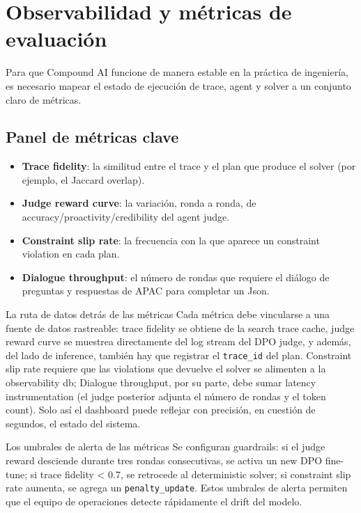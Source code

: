 \section{Observabilidad y métricas de evaluación}

Para que Compound AI funcione de manera estable en la práctica de ingeniería, es necesario mapear el estado de ejecución de trace, agent y solver a un conjunto claro de métricas.

\subsection{Panel de métricas clave}

\begin{itemize}
    \item \textbf{Trace fidelity}: la similitud entre el trace y el plan que produce el solver (por ejemplo, el Jaccard overlap).
    \item \textbf{Judge reward curve}: la variación, ronda a ronda, de accuracy/proactivity/credibility del agent judge.
    \item \textbf{Constraint slip rate}: la frecuencia con la que aparece un constraint violation en cada plan.
    \item \textbf{Dialogue throughput}: el número de rondas que requiere el diálogo de preguntas y respuestas de APAC para completar un Json.
\end{itemize}

\begin{importantbox}{La ruta de datos detrás de las métricas}
Cada métrica debe vincularse a una fuente de datos rastreable: trace fidelity se obtiene de la search trace cache, judge reward curve se muestrea directamente del log stream del DPO judge, y además, del lado de inference, también hay que registrar el \texttt{trace\_id} del plan. Constraint slip rate requiere que las violations que devuelve el solver se alimenten a la observability db; Dialogue throughput, por su parte, debe sumar latency instrumentation (el judge posterior adjunta el número de rondas y el token count). Solo así el dashboard puede reflejar con precisión, en cuestión de segundos, el estado del sistema.
\end{importantbox}

\begin{knowledgebox}{Los umbrales de alerta de las métricas}
Se configuran guardrails: si el judge reward desciende durante tres rondas consecutivas, se activa un new DPO fine-tune; si trace fidelity < 0.7, se retrocede al deterministic solver; si constraint slip rate aumenta, se agrega un \texttt{penalty\_update}. Estos umbrales de alerta permiten que el equipo de operaciones detecte rápidamente el drift del modelo.
\end{knowledgebox}

